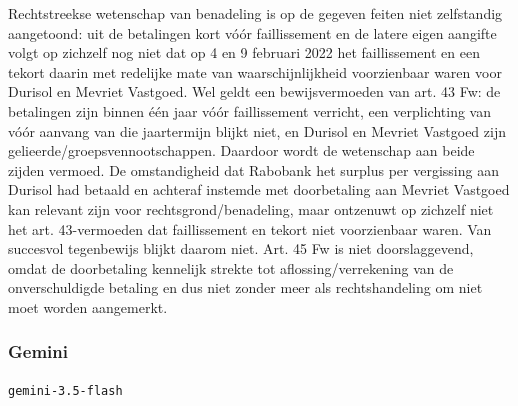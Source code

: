 \documentclass[
  dutch,
  a4paper,
]{article}
\begin{document}
Rechtstreekse wetenschap van benadeling is op de gegeven feiten niet zelfstandig aangetoond: uit de betalingen kort vóór faillissement en de latere eigen aangifte volgt op zichzelf nog niet dat op 4 en 9 februari 2022 het faillissement en een tekort daarin met redelijke mate van waarschijnlijkheid voorzienbaar waren voor Durisol en Mevriet Vastgoed. Wel geldt een bewijsvermoeden van art. 43 Fw: de betalingen zijn binnen één jaar vóór faillissement verricht, een verplichting van vóór aanvang van die jaartermijn blijkt niet, en Durisol en Mevriet Vastgoed zijn gelieerde/groepsvennootschappen. Daardoor wordt de wetenschap aan beide zijden vermoed. De omstandigheid dat Rabobank het surplus per vergissing aan Durisol had betaald en achteraf instemde met doorbetaling aan Mevriet Vastgoed kan relevant zijn voor rechtsgrond/benadeling, maar ontzenuwt op zichzelf niet het art. 43-vermoeden dat faillissement en tekort niet voorzienbaar waren. Van succesvol tegenbewijs blijkt daarom niet. Art. 45 Fw is niet doorslaggevend, omdat de doorbetaling kennelijk strekte tot aflossing/verrekening van de onverschuldigde betaling en dus niet zonder meer als rechtshandeling om niet moet worden aangemerkt.

\newpage


\subsubsection{Gemini}\label{gemini-5}

\texttt{gemini-3.5-flash}
\end{document}
